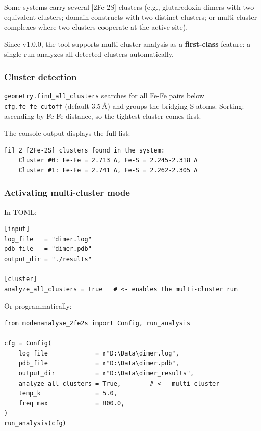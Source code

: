 \documentclass[11pt,a4paper,twoside]{article}
\theoremstyle{remark}
\begin{document}
Some systems carry several {[}2Fe-2S{]} clusters (e.g.,
glutaredoxin dimers with two equivalent clusters; domain constructs
with two distinct clusters; or multi-cluster complexes where two
clusters cooperate at the active site).

Since v1.0.0, the tool supports multi-cluster analysis as a
\textbf{first-class} feature: a single run analyzes all detected
clusters automatically.

\subsubsection*{Cluster detection}

\texttt{geometry.find\_all\_clusters} searches for all Fe-Fe pairs
below \texttt{cfg.fe\_fe\_cutoff} (default 3.5\,\AA{}) and groups
the bridging S atoms. Sorting: ascending by Fe-Fe distance, so the
tightest cluster comes first.

The console output displays the full list:

\begin{lstlisting}[style=bash]
[i] 2 [2Fe-2S] clusters found in the system:
    Cluster #0: Fe-Fe = 2.713 A, Fe-S = 2.245-2.318 A
    Cluster #1: Fe-Fe = 2.741 A, Fe-S = 2.262-2.305 A
\end{lstlisting}

\subsubsection*{Activating multi-cluster mode}

In TOML:

\begin{lstlisting}[style=python]
[input]
log_file   = "dimer.log"
pdb_file   = "dimer.pdb"
output_dir = "./results"

[cluster]
analyze_all_clusters = true   # <- enables the multi-cluster run
\end{lstlisting}

Or programmatically:

\begin{lstlisting}[style=python]
from modenanalyse_2fe2s import Config, run_analysis

cfg = Config(
    log_file             = r"D:\Data\dimer.log",
    pdb_file             = r"D:\Data\dimer.pdb",
    output_dir           = r"D:\Data\dimer_results",
    analyze_all_clusters = True,        # <-- multi-cluster
    temp_k               = 5.0,
    freq_max             = 800.0,
)
run_analysis(cfg)
\end{lstlisting}
\end{document}
